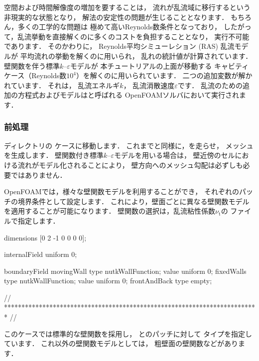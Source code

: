 空間および時間解像度の増加を要することは，
流れが乱流域に移行するという非現実的な状態となり，
解法の安定性の問題が生じることとなります．
もちろん，多くの工学的な問題は
極めて高いReynolds数条件となっており，
したがって，乱流挙動を直接解くのに多くのコストを負担することとなり，
実行不可能であります．
そのかわりに，
%
Reynolds平均シミューレション (RAS) 乱流モデルが
平均流れの挙動を解くのに用いられ，
乱れの統計値が計算されています．
壁関数を伴う標準$k$--$\varepsilon$モデルが
本チュートリアルの上面が移動する
キャビティケース（Reynolds数$10^{4}$）を解くのに用いられています．
二つの追加変数が解かれています．
それは，
%
乱流エネルギ$k$，
%
乱流消散速度$\varepsilon$です．
乱流のための追加の方程式およびモデルはと呼ばれる
OpenFOAMソルバにおいて実行されます．

\subsubsection{前処理}
\label{sssec:2.1.8.1}
ディレクトリの
ケースに移動します．
これまでと同様に，を走らせ，
メッシュを生成します．
壁関数付き標準$k$--$\varepsilon$モデルを用いる場合は，
壁近傍のセルにおける流れがモデル化されることにより，
壁方向へのメッシュ勾配は必ずしも必要ではありません．

OpenFOAMでは，様々な壁関数モデルを利用することができ，
それぞれのパッチの境界条件として設定します．
これにより，壁面ごとに異なる壁関数モデルを適用することが可能になります．
壁関数の選択は，乱流粘性係数$\nu_{\mathrm{t}}$の
ファイルで指定します．
\begin{OFverbatim}[file, linenum=17]

dimensions      [0 2 -1 0 0 0 0];

internalField   uniform 0;

boundaryField
{
    movingWall
    {
        type            nutkWallFunction;
        value           uniform 0;
    }
    fixedWalls
    {
        type            nutkWallFunction;
        value           uniform 0;
    }
    frontAndBack
    {
        type            empty;
    }
}


// ************************************************************************* //
\end{OFverbatim}
このケースでは標準的な壁関数を採用し，
とのパッチに対して
タイプを指定しています．
これ以外の壁関数モデルとしては，
粗壁面の壁関数などがあります．

